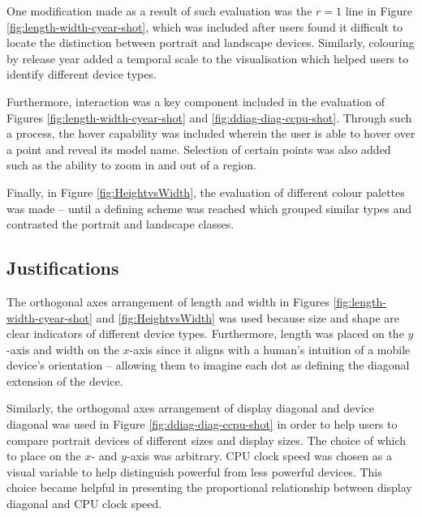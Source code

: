 \documentclass[conference]{IEEEtran}
\begin{document}
One modification made as a result of such evaluation was the $r=1$ line in
Figure \ref{fig:length-width-cyear-shot}, which was included after users
found it difficult to locate the distinction between portrait and landscape
devices. Similarly, colouring by release year added a temporal scale to the
visualisation which helped users to identify different device types.

Furthermore, interaction was a key component included in the evaluation of
Figures \ref{fig:length-width-cyear-shot} and \ref{fig:ddiag-diag-ccpu-shot}.
Through such a process, the hover capability was included wherein the user is
able to hover over a point and reveal its model name. Selection of certain
points was also added such as the ability to zoom in and out of a region.

Finally, in Figure \ref{fig:HeightvsWidth}, the evaluation of different colour
palettes was made -- until a defining scheme was reached which grouped similar
types and contrasted the portrait and landscape classes.

\subsection{Justifications}

The orthogonal axes arrangement of length and width in Figures
\ref{fig:length-width-cyear-shot} and \ref{fig:HeightvsWidth} was used because
size and shape are clear indicators of different device types. Furthermore,
length was placed on the $y$-axis and width on the $x$-axis since it aligns
with a human's intuition of a mobile device's orientation -- allowing them to
imagine each dot as defining the diagonal extension of the device.

Similarly, the orthogonal axes arrangement of display diagonal and device
diagonal was used in Figure \ref{fig:ddiag-diag-ccpu-shot} in order to help
users to compare portrait devices of different sizes and display sizes. The
choice of which to place on the $x$- and $y$-axis was arbitrary. CPU clock
speed was chosen as a visual variable to help distinguish powerful from less
powerful devices. This choice became helpful in presenting the proportional
relationship between display diagonal and CPU clock speed.
\end{document}
